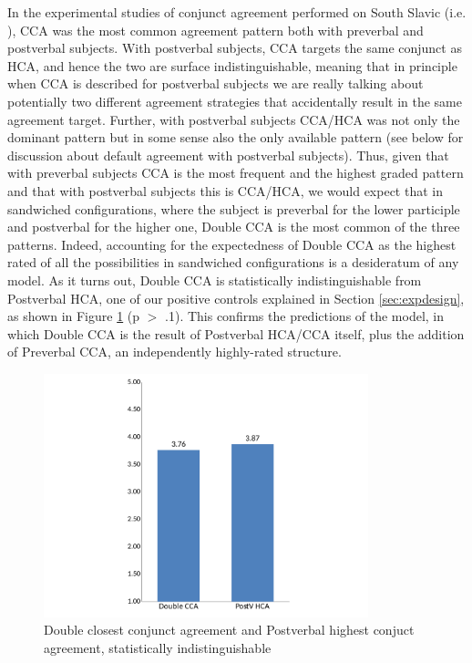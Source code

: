 \documentclass[output=paper
,modfonts
,nonflat]{langsci/langscibook}
\begin{document}
In the experimental studies of conjunct agreement performed on South Slavic (i.e. \citealt{marusicnevinsbadecker:15,willergold:16}), CCA was the most common agreement pattern both with preverbal and postverbal subjects. With postverbal subjects, CCA targets the same conjunct as HCA, and hence the two are surface indistinguishable, meaning that in principle when CCA is described for postverbal subjects we are really talking about potentially two different agreement strategies that accidentally result in the same agreement target. Further, with postverbal subjects CCA/HCA was not only the dominant pattern but in some sense also the only available pattern (see below for discussion about default agreement with postverbal subjects). Thus, given that with preverbal subjects CCA is the most frequent and the highest graded pattern and that with postverbal subjects this is CCA/HCA, we would expect that in sandwiched configurations, where the subject is preverbal for the lower participle and postverbal for the higher one, Double CCA is the most common of the three patterns. Indeed, accounting for the expectedness of Double CCA as the highest rated of all the possibilities in sandwiched configurations is a desideratum of any model. As it turns out, Double CCA is statistically indistinguishable from Postverbal HCA, one of our positive controls explained in Section \ref{sec:expdesign}, as shown in Figure \ref{fig:figure_cca_postv} (p $>$ .1). This confirms the predictions of the model, in which Double CCA is the result of Postverbal HCA/CCA itself, plus the addition of Preverbal CCA, an independently highly-rated structure.

\begin{figure}[h]
\begin{center}
\includegraphics[height=200pt]{figures/cca_postv_nl.pdf}
\end{center}
\caption{Double closest conjunct agreement and Postverbal highest conjuct agreement, statistically indistinguishable}
\label{fig:figure_cca_postv}
\end{figure}
\end{document}
